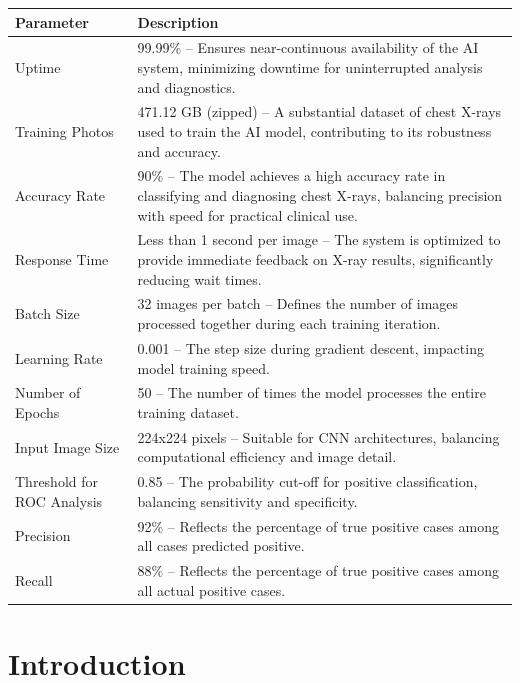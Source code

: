 \documentclass[12pt]{article}
\begin{document}
\renewcommand{\arraystretch}{1.3}
\noindent \begin{tabular}{|p{3.5cm}|p{9.5cm}|}
    \hline
    \rowcolor{lightgray} \textbf{Parameter} & \textbf{Description} \\
    \hline
    Uptime & 99.99\% – Ensures near-continuous availability of the AI system, minimizing downtime for uninterrupted analysis and diagnostics. \\
    \hline
    Training Photos & 471.12 GB (zipped) – A substantial dataset of chest X-rays used to train the AI model, contributing to its robustness and accuracy. \\
    \hline
    Accuracy Rate & 90\% – The model achieves a high accuracy rate in classifying and diagnosing chest X-rays, balancing precision with speed for practical clinical use. \\
    \hline
    Response Time & Less than 1 second per image – The system is optimized to provide immediate feedback on X-ray results, significantly reducing wait times. \\
    \hline
    Batch Size & 32 images per batch – Defines the number of images processed together during each training iteration. \\
    \hline
    Learning Rate & 0.001 – The step size during gradient descent, impacting model training speed. \\
    \hline
    Number of Epochs & 50 – The number of times the model processes the entire training dataset. \\
    \hline
    Input Image Size & 224x224 pixels – Suitable for CNN architectures, balancing computational efficiency and image detail. \\
    \hline
    Threshold for ROC Analysis & 0.85 – The probability cut-off for positive classification, balancing sensitivity and specificity. \\
    \hline
    Precision & 92\% – Reflects the percentage of true positive cases among all cases predicted positive. \\
    \hline
    Recall & 88\% – Reflects the percentage of true positive cases among all actual positive cases. \\
    \hline
\end{tabular}


\newpage

\section{Introduction}
\end{document}
